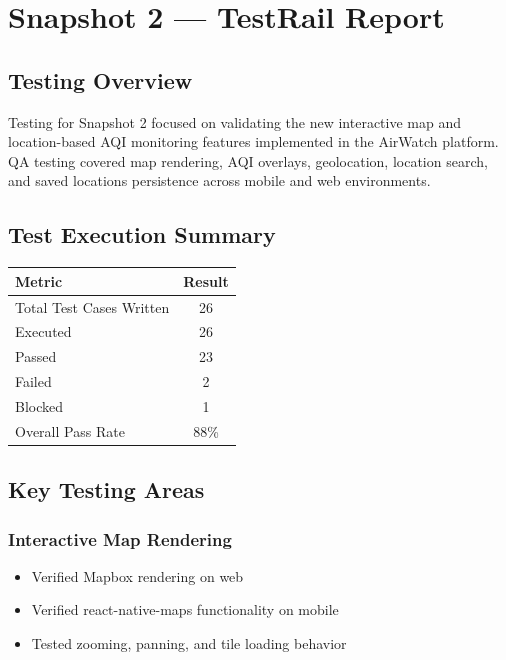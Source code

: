 \section{Snapshot 2 --- TestRail Report}

\subsection{Testing Overview}

Testing for Snapshot 2 focused on validating the new interactive map and location-based AQI monitoring features implemented in the AirWatch platform. QA testing covered map rendering, AQI overlays, geolocation, location search, and saved locations persistence across mobile and web environments.

\subsection{Test Execution Summary}

\begin{table}[h]
\centering
\begin{tabular}{|l|c|}
\hline
\textbf{Metric} & \textbf{Result} \\
\hline
Total Test Cases Written & 26 \\
Executed & 26 \\
Passed & 23 \\
Failed & 2 \\
Blocked & 1 \\
Overall Pass Rate & 88\% \\
\hline
\end{tabular}
\end{table}

\subsection{Key Testing Areas}

\subsubsection{Interactive Map Rendering}
\begin{itemize}
    \item Verified Mapbox rendering on web
    \item Verified react-native-maps functionality on mobile
    \item Tested zooming, panning, and tile loading behavior
\end{itemize}

